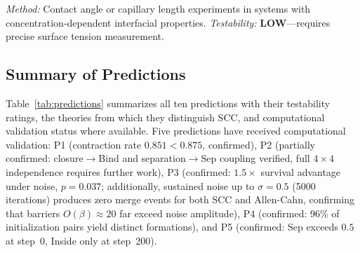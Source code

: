 \documentclass[lettersize,journal]{IEEEtran}
\begin{document}
\emph{Method:} Contact angle or capillary length experiments in systems with concentration-dependent interfacial properties. \emph{Testability:} \textbf{LOW}---requires precise surface tension measurement.

\subsection{Summary of Predictions}

Table~\ref{tab:predictions} summarizes all ten predictions with their testability ratings, the theories from which they distinguish SCC, and computational validation status where available. Five predictions have received computational validation: P1 (contraction rate $0.851 < 0.875$, confirmed), P2 (partially confirmed: closure$\to$Bind and separation$\to$Sep coupling verified, full $4\times4$ independence requires further work), P3 (confirmed: $1.5\times$ survival advantage under noise, $p = 0.037$; additionally, sustained noise up to $\sigma = 0.5$ (5000 iterations) produces zero merge events for both SCC and Allen-Cahn, confirming that barriers $O(\beta) \approx 20$ far exceed noise amplitude), P4 (confirmed: 96\% of initialization pairs yield distinct formations), and P5 (confirmed: Sep exceeds $0.5$ at step~0, Inside only at step~200).
\end{document}

